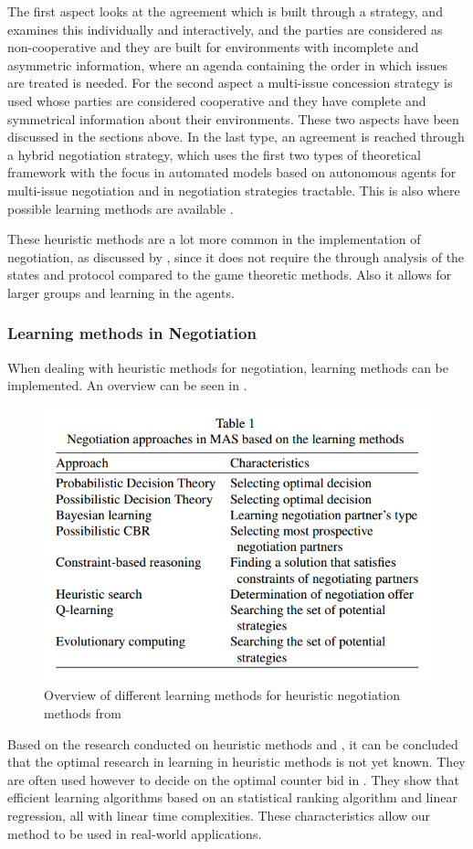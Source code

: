 	The first aspect looks at the agreement which is built through a strategy, and examines this individually and interactively, and the parties are considered as non-cooperative and they are built for environments with incomplete and asymmetric information, where an agenda containing the order in which issues are treated is needed. For the second aspect a multi-issue concession strategy is used whose parties are considered cooperative and they have complete and symmetrical information about their environments. These two aspects have been discussed in the sections above. In the last type, an agreement is reached through a hybrid negotiation strategy, which uses the first two types of theoretical framework with the focus in automated models based on autonomous agents for multi-issue negotiation and in negotiation strategies tractable. This is also where possible learning methods are available \citep{schramm2013bilateral}. 
	
	These heuristic methods are a lot more common in the implementation of negotiation, as discussed by \citet{leitao2013past, monostori2006agent}, since it does not require the through analysis of the states and protocol compared to the game theoretic methods. Also it allows for larger groups and learning in the agents.
	
\subsubsection{Learning methods in Negotiation}
When dealing with heuristic methods for negotiation, learning methods can be implemented. An overview can be seen in . 

\begin{figure}
\centering
\includegraphics[width=0.7\linewidth]{img/negotiation_learning}
\caption{Overview of different learning methods for heuristic negotiation methods from \citet{beheshti2014homan}}
\label{fig:negotiationlearning}
\end{figure}
Based on the research conducted on heuristic methods and \citet{jennings2001automated}, it can be concluded that the optimal research in learning in heuristic methods is not yet known. They are often used however to decide on the optimal counter bid in \citet{beheshti2014homan}. They show that efficient learning algorithms based on an statistical ranking algorithm and linear regression, all with linear time complexities. These characteristics allow our method to be used in real-world applications. 
